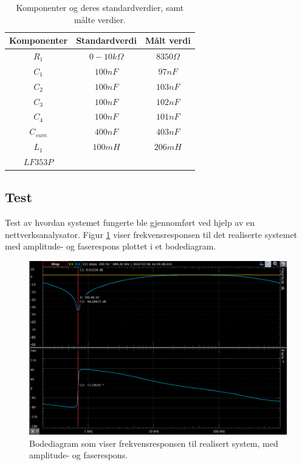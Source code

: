 \documentclass[a4paper,11pt,norsk]{article}
\begin{document}
\begin{table}[h]
  \centering
  \caption{Komponenter og deres standardverdier, samt målte verdier.}
  \label{tab:komp}
  \begin{tabular}{|c|c|c|}
    \hline\hline
    Komponenter & Standardverdi & Målt verdi \\
    \hline\hline
    $R_1$   & $0-10k\Omega$ & $8350\Omega$\\
    \hline
    $C_1$   & $100nF$       & $97nF$\\
    \hline
    $C_2$   & $100nF$       & $103nF$\\
    \hline
    $C_3$   & $100nF$       & $102nF$\\
    \hline
    $C_4$   & $100nF$       & $101nF$\\
    \hline
    $C_{sum}$   & $400nF$       & $403nF$\\
    \hline
    $L_1$   & $100mH$       & $206mH$\\
    \hline
    $LF353P$&&\\
    \hline\hline
  \end{tabular}
\end{table}
\subsection{Test}
Test av hvordan systemet fungerte ble gjennomført ved hjelp av en nettverksanalysator. Figur \ref{fig:netverk} viser frekvensresponsen til det realiserte systemet med amplitude- og faserespons plottet i et bodediagram. 

\begin{figure}[H]
  \centering
  \includegraphics[scale=0.7]{D1/Images/network.png}
  \caption{Bodediagram som viser frekvensresponsen til realisert system, med amplitude- og faserespons.}
  \label{fig:netverk}
\end{figure}
\end{document}
